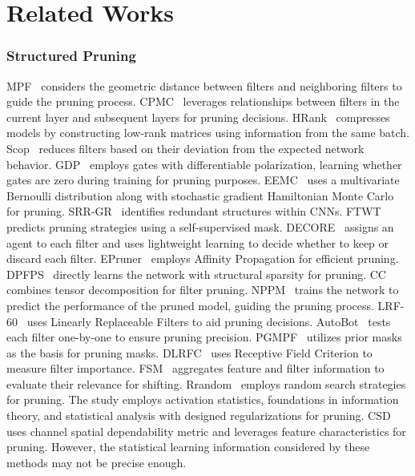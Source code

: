 \section{Related Works}
\subsubsection{Structured Pruning}
\label{sec:structured}
MPF~\cite{He2019FilterPB} considers the geometric distance between filters and neighboring filters to guide the pruning process. CPMC~\cite{Yan2020ChannelPV} leverages relationships between filters in the current layer and subsequent layers for pruning decisions. HRank~\cite{Lin2020HRankFP} compresses models by constructing low-rank matrices using information from the same batch. Scop~\cite{Tang2020SCOPSC} reduces filters based on their deviation from the expected network behavior. 
GDP~\cite{Guo2021GDPSN} employs gates with differentiable polarization, learning whether gates are zero during training for pruning purposes. EEMC~\cite{Zhang2021ExplorationAE} uses a multivariate Bernoulli distribution along with stochastic gradient Hamiltonian Monte Carlo for pruning. SRR-GR~\cite{Wang2021ConvolutionalNN} identifies redundant structures within CNNs. FTWT~\cite{Elkerdawy2021FireTW} predicts pruning strategies using a self-supervised mask. DECORE~\cite{Alwani2021DECOREDC} assigns an agent to each filter and uses lightweight learning to decide whether to keep or discard each filter. EPruner~\cite{Lin2021NetworkPU} employs Affinity Propagation for efficient pruning. DPFPS~\cite{Ruan2021DPFPSDA} directly learns the network with structural sparsity for pruning. CC~\cite{Li2021TowardsCC} combines tensor decomposition for filter pruning. NPPM~\cite{Gao2021NetworkPV} trains the network to predict the performance of the pruned model, guiding the pruning process. LRF-60~\cite{Joo2021LinearlyRF} uses Linearly Replaceable Filters to aid pruning decisions. AutoBot~\cite{Castells2021AutomaticNN} tests each filter one-by-one to ensure pruning precision. 
PGMPF~\cite{Cai2022PriorGM} utilizes prior masks as the basis for pruning masks. DLRFC~\cite{He2022FilterPV} uses Receptive Field Criterion to measure filter importance. FSM~\cite{Duan2022NetworkPV} aggregates feature and filter information to evaluate their relevance for shifting. Rrandom~\cite{Li2022RevisitingRC} employs random search strategies for pruning.  The study \cite{Hussien2024SmallCS} employs activation statistics, foundations in information theory, and statistical analysis with designed regularizations for pruning. CSD~\cite{Xie2024AdaptivePO} uses channel spatial dependability metric and leverages feature characteristics for pruning. However, the statistical learning information considered by these methods may not be precise enough.



